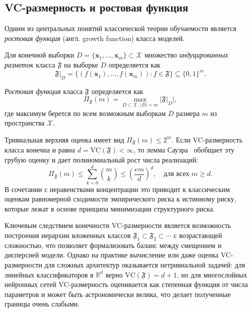 \subsection{VC-размерность и ростовая функция}

Одним из центральных понятий классической теории обучаемости является \textit{ростовая функция} (англ. growth function) класса моделей.

\begin{definition}
    Для конечной выборки $D = \{\mathbf{x}_1,\ldots,\mathbf{x}_m\} \subset \mathcal{X}$ множество \textit{индуцированных разметок} класса $\mathfrak{F}$ на выборке $D$ определяется как
    \[
        \mathfrak{F}|_D = \{(f(\mathbf{x}_1),\ldots,f(\mathbf{x}_m)) : f \in \mathfrak{F}\} \subseteq \{0,1\}^m.
    \]
\end{definition}

\begin{definition}
    \textit{Ростовая функция} класса $\mathfrak{F}$ определяется как
    \[
        \Pi_{\mathfrak{F}}(m) = \max_{D \subset \mathcal{X},\, |D| = m} |\mathfrak{F}|_D|,
    \]
    где максимум берется по всем возможным выборкам $D$ размера $m$ из пространства $\mathcal{X}$.
\end{definition}
Тривиальная верхняя оценка имеет вид $\Pi_{\mathfrak{F}}(m) \leq 2^m$. Если VC-размерность класса конечна и равна $d = \mathrm{VC}(\mathfrak{F}) < \infty$, то лемма Сауэра~\cite[глава~5, лемма~5.1]{vapnik1974StatTheory} обобщает эту грубую оценку и дает полиномиальный рост числа реализаций:
\[
    \Pi_{\mathfrak{F}}(m) \leq \sum_{k=0}^{d} \binom{m}{k} \leq \left(\frac{em}{d}\right)^{d}, \quad \text{для всех } m \geq d.
\]
В сочетании с неравенствами концентрации это приводит к классическим оценкам равномерной сходимости эмпирического риска к истинному риску, которые лежат в основе принципа минимизации структурного риска.

Ключевым следствием конечности VC-размерности является возможность построения иерархии вложенных классов $\mathfrak{F}_1 \subset \mathfrak{F}_2 \subset \cdots$ с возрастающей сложностью, что позволяет формализовать баланс между смещением и дисперсией модели. Однако на практике вычисление или даже оценка VC-размерности для сложных архитектур оказывается нетривиальной задачей: для линейных классификаторов в $\mathbb{R}^d$ верно $\mathrm{VC}(\mathfrak{F}) = d+1$, но для многослойных нейронных сетей VC-размерность оценивается как степенная функция от числа параметров и может быть астрономически велика, что делает полученные границы очень слабыми.

